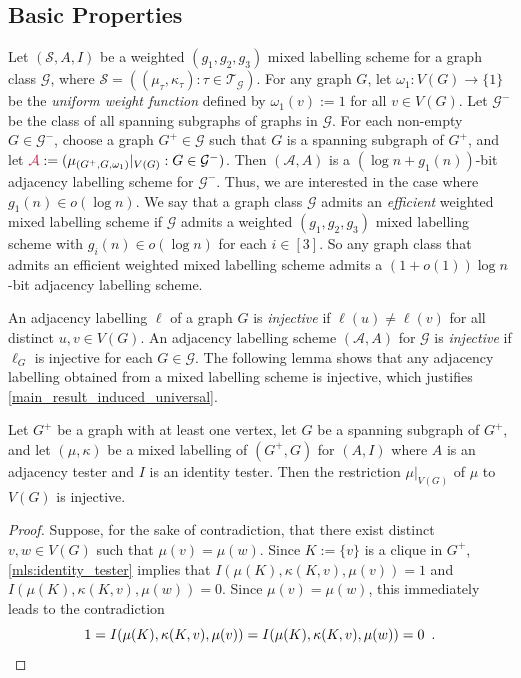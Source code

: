 \documentclass{patmorin}
\makeatletter
\newcommand{\defin}[1]{\emph{\textcolor{brightmaroon}{#1}}}
\def\mathcolor#1#{\@mathcolor{#1}}
\def\@mathcolor#1#2#3{%
  \protect\leavevmode
  \begingroup
    \color#1{#2}#3%
  \endgroup
}
\newcommand{\mathdefin}[1]{\mathcolor{brightmaroon}{#1}}
\newcommand{\calA}{\mathcal{A}}
\newcommand{\calG}{\mathcal{G}}
\newcommand{\calS}{\mathcal{S}}
\newcommand{\calT}{\mathcal{T}}
\makeatother
\begin{document}
\subsection{Basic Properties}
\label{basic_properties}

Let $(\calS,A,I)$ be a weighted $(g_1,g_2,g_3)$ mixed labelling scheme for a graph class $\calG$, where $\calS = ((\mu_\tau,\kappa_\tau):\tau\in\calT_\calG)$. For any graph $G$, let $\omega_1:V(G)\to\{1\}$ be the \defin{uniform weight function} defined by $\omega_1(v):=1$ for all $v\in V(G)$.  Let $\calG^-$ be the class of all spanning subgraphs of graphs in $\calG$. For each non-empty $G\in\calG^-$, choose a graph $G^+\in\calG$ such that $G$ is a spanning subgraph of $G^+$, and let $\mathdefin{\calA}:=(\mu_{(G^+,G,\omega_1)}|_{V(G)}:G\in\calG^-)$. Then $(\calA,A)$ is a $(\log n+g_1(n))$-bit adjacency labelling scheme for $\calG^-$.  Thus, we are interested in the case where $g_1(n)\in o(\log n)$. We say that a graph class $\calG$ admits an \defin{efficient} weighted mixed labelling scheme if $\calG$ admits a weighted $(g_1,g_2,g_3)$ mixed labelling scheme with $g_i(n)\in o(\log n)$ for each $i\in [3]$. So any graph class that admits an efficient weighted mixed labelling scheme admits a $(1+o(1))\log n$-bit adjacency labelling scheme. 

An adjacency labelling $\ell$ of a graph $G$ is \defin{injective} if $\ell(u)\neq\ell(v)$ for all distinct $u,v\in V(G)$. An adjacency labelling scheme $(\calA,A)$ for $\calG$ is \defin{injective} if $\ell_G$ is injective for each $G\in\calG$. The following lemma shows that any adjacency labelling obtained from a mixed labelling scheme is injective, which justifies \cref{main_result_induced_universal}.

\begin{lem}\label{injective_vertex_labels}
  Let $G^+$ be a graph with at least one vertex, let $G$ be a spanning subgraph of $G^+$, and let $(\mu,\kappa)$ be a mixed labelling of $(G^+,G)$ for $(A,I)$ where $A$ is an adjacency tester and $I$ is an identity tester. Then the restriction $\mu|_{V(G)}$ of $\mu$ to $V(G)$ is injective.
\end{lem}

\begin{proof}
  Suppose, for the sake of contradiction, that there exist distinct $v,w\in V(G)$ such that $\mu(v)=\mu(w)$. Since $K:=\{v\}$ is a clique in $G^+$, \ref{mls:identity_tester} implies that $I(\mu(K),\kappa(K,v),\mu(v))=1$ and $I(\mu(K),\kappa(K,v),\mu(w))=0$. Since $\mu(v)=\mu(w)$, this immediately leads to the contradiction
  \[
    1 = I(\mu(K),\kappa(K,v),\mu(v)) = I(\mu(K),\kappa(K,v),\mu(w)) = 0 \enspace. \qedhere
  \]
\end{proof}
\end{document}
